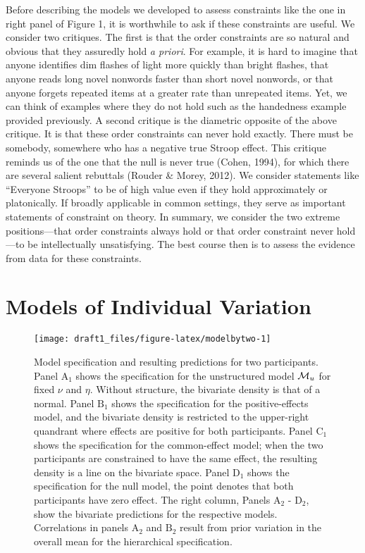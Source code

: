 \documentclass[american,man]{apa6}
\begin{document}
Before describing the models we developed to assess constraints like the
one in right panel of Figure 1, it is worthwhile to ask if these
constraints are useful. We consider two critiques. The first is that the
order constraints are so natural and obvious that they assuredly hold
\emph{a priori}. For example, it is hard to imagine that anyone
identifies dim flashes of light more quickly than bright flashes, that
anyone reads long novel nonwords faster than short novel nonwords, or
that anyone forgets repeated items at a greater rate than unrepeated
items. Yet, we can think of examples where they do not hold such as the
handedness example provided previously. A second critique is the
diametric opposite of the above critique. It is that these order
constraints can never hold exactly. There must be somebody, somewhere
who has a negative true Stroop effect. This critique reminds us of the
one that the null is never true (Cohen, 1994), for which there are
several salient rebuttals (Rouder \& Morey, 2012). We consider
statements like \enquote{Everyone Stroops} to be of high value even if
they hold approximately or platonically. If broadly applicable in common
settings, they serve as important statements of constraint on theory. In
summary, we consider the two extreme positions---that order constraints
always hold or that order constraint never hold---to be intellectually
unsatisfying. The best course then is to assess the evidence from data
for these constraints.

\section{Models of Individual
Variation}\label{models-of-individual-variation}

\begin{figure}

{\centering \texttt{[image: draft1\_files/figure-latex/modelbytwo-1]} 

}

\caption{{\footnotesize  Model specification and resulting predictions for two participants.  Panel $\mbox{A}_1$ shows the specification for the unstructured model ${\cal M}_u$ for fixed $\nu$ and $\eta$.  Without structure, the bivariate density is that of a normal.  Panel $\mbox{B}_1$ shows the specification for the positive-effects model, and the bivariate density is restricted to the upper-right quandrant where effects are positive for both participants.  Panel $\mbox{C}_1$ shows the specification for the common-effect model; when the two participants are constrained to have the same effect, the resulting density is a line on the bivariate space.  Panel $\mbox{D}_1$ shows the specification for the null model, the point denotes that both participants have zero effect.  The right column, Panels $\mbox{A}_2$ - $\mbox{D}_2$, show the bivariate predictions for the respective models.  Correlations in panels $\mbox{A}_2$ and $\mbox{B}_2$} result from prior variation in the overall mean for the hierarchical specification.}\label{fig:modelbytwo}
\end{figure}
\end{document}

